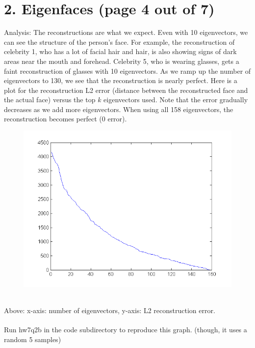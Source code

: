 \documentclass[11pt]{article}
\begin{document}
\section*{2. Eigenfaces (page 4 out of 7)}
Analysis: The reconstructions are what we expect. Even with 10 eigenvectors, we can see the structure of the person's face. For example, the reconstruction of celebrity 1, who has a lot of facial hair and hair, is also showing signs of dark areas near the mouth and forehead. Celebrity 5, who is wearing glasses, gets a faint reconstruction of glasses with 10 eigenvectors. As we ramp up the number of eigenvectors to 130, we see that the reconstruction is nearly perfect. Here is a plot for the reconstruction L2 error (distance between the reconstructed face and the actual face) versus the top $k$ eigenvectors used. Note that the  error gradually decreases as we add more eigenvectors. When using all 158 eigenvectors, the reconstruction becomes perfect (0 error). \\
\begin{figure}[ht!]
\centering
\includegraphics[width=180mm]{images/hw7q2berror.png}
\label{overflow}
\end{figure} \\
Above: x-axis: number of eigenvectors, y-axis: L2 reconstruction error. \\\\
Run hw7q2b in the code subdirectory to reproduce this graph. (though, it uses a random 5 samples)
\newpage
\end{document}

